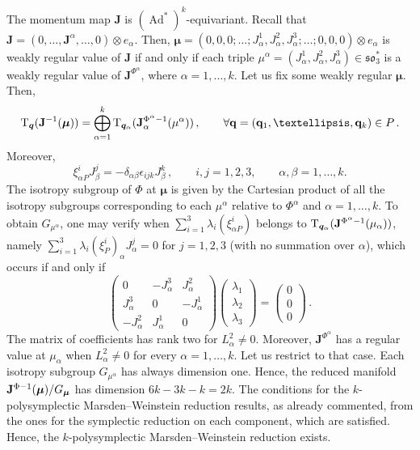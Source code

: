 \documentclass[11pt]{article}
\theoremstyle{plain}
\theoremstyle{definition}
\newcommand{\T}{\mathrm{T}}
\DeclareMathOperator{\Ad}{Ad}
\numberwithin{equation}{section}
\begin{document}
The momentum map $\mathbf{J}$ is $(\Ad^*)^k$-equivariant. Recall that $\mathbf{J}=(0,\ldots,\mathbf{J}^{\alpha},\ldots,0)\otimes e_\alpha$. Then, $\bm{\mu}=(0,0,0;\ldots;J_\alpha^1,J_\alpha^2,J_\alpha^3;\ldots;0,0,0)\otimes e_\alpha$ is weakly regular value of $\mathbf{J}$ if and only if each triple $\mu^\alpha=(J_\alpha^1,J_\alpha^2,J_\alpha^3)\in\mathfrak{so}_3^*$ is a weakly regular value of $\mathbf{J}^{\Phi^\alpha}$, where $\alpha=1,\ldots,k$. Let us fix some weakly regular $\bm\mu$. Then,
\[
    \T_{\boldsymbol{q}}(\mathbf{J}^{-1}(\bm\mu))=\bigoplus _{\alpha=1}^k\T_{{\boldsymbol{q}}_\alpha}(\mathbf{J}_\alpha^{\Phi^\alpha-1}(\mu^\alpha))\,,\qquad \forall {\bf q}=({\bf q}_1,\ldots,{\bf q}_k)\in P\,.
\]
Moreover, 
\[
\xi_{\alpha P}^iJ^j_\beta = -\delta_{\alpha\beta}\epsilon_{ijk}J^k_\beta\,,\qquad i,j=1,2,3,\qquad \alpha,\beta=1,\ldots,k.
\]
The isotropy subgroup of $\Phi$ at $\bm \mu$ is given by the Cartesian product of all the isotropy subgroups corresponding to each $\mu^\alpha$ relative to  $\Phi^\alpha$ and $\alpha=1,\ldots,k$. To obtain $G_{\mu^\alpha}$, one may verify when $\sum_{i=1}^3\lambda_i(\xi_{\alpha P}^i)$ belongs to $\T_{{\boldsymbol{q}_\alpha}}({\bf J}^{\Phi^\alpha-1}(\mu_\alpha))$, namely $\sum_{i=1}^3\lambda_i(\xi_P^i)_\alpha J^j_\alpha=0$ for $j=1,2,3$ (with no summation over $\alpha$), which occurs if and only if
$$
    \begin{pmatrix}
        0&-J_\alpha^3&J_\alpha^2\\
        J_\alpha^3&0&-J_\alpha^1\\
        -J_\alpha^2&J_\alpha^1&0
    \end{pmatrix}\begin{pmatrix}\lambda_1\\\lambda _2\\\lambda_3\end{pmatrix} = \begin{pmatrix}0\\0\\0\end{pmatrix}\,.
$$
The matrix of coefficients has rank two for $L^2_\alpha\neq 0$. Moreover,  $\mathbf{J}^{\Phi^\alpha}$ has a regular value at $\mu_\alpha$ when $L^2_\alpha\neq 0$ for every $\alpha=1,\ldots,k$. Let us restrict to that case. Each isotropy subgroup $G_{\mu^\alpha}$ has always dimension one. Hence, the reduced manifold ${\bf J}^{\Phi-1}({\bm \mu})/G_{\bm \mu}$ has dimension $6k-3k-k=2k$. The conditions for the $k$-polysymplectic Marsden--Weinstein reduction results, as already commented, from the ones for the symplectic reduction on each component, which are satisfied. Hence, the $k$-polysymplectic Marsden--Weinstein reduction exists.
\end{document}
